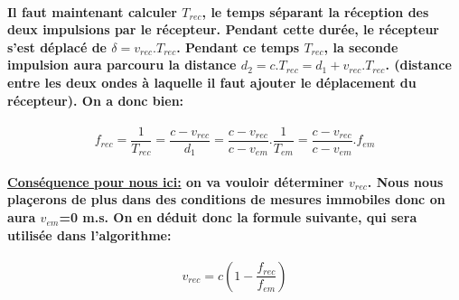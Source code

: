 \documentclass[a4paper,11pt]{article}
\begin{document}
\paragraph{\normalfont Il faut maintenant calculer $T_{rec}$, le temps s\'{e}parant la r\'{e}ception des deux impulsions par le r\'{e}cepteur. Pendant cette dur\'{e}e, le r\'{e}cepteur s'est d\'{e}plac\'{e} de $\delta=v_{rec}.T_{rec}$. Pendant ce temps $T_{rec}$, la seconde impulsion aura parcouru la distance $d_2=c.T_{rec}=d_1+v_{rec}.T_{rec}$. (distance entre les deux ondes \`{a} laquelle il faut ajouter le d\'{e}placement du r\'{e}cepteur). On a donc bien:}
\[f_{rec}=\frac{1}{T_{rec}}=\frac{c-v_{rec}}{d_1}=\frac{c-v_{rec}}{c-v_{em}}.\frac{1}{T_{em}}=\frac{c-v_{rec}}{c-v_{em}}.f_{em}\]
\paragraph{\normalfont \textbf{\underline{Cons\'{e}quence pour nous ici:}} on va vouloir d\'{e}terminer $v_{rec}$. Nous nous pla\c{c}erons de plus dans des conditions de mesures immobiles donc on aura $v_{em}$=0 m.s. On en d\'{e}duit donc la formule suivante, qui sera utilis\'{e}e dans l'algorithme:}
\[\boxed{v_{rec}=c(1-\frac{f_{rec}}{f_{em}})}\]
\end{document}
